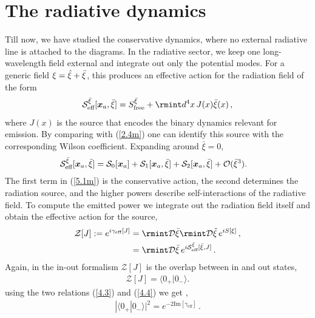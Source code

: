 \section{The radiative dynamics}\label{Sec5}
Till now, we have studied the conservative dynamics, where no external radiative line is attached to the diagrams. In the radiative sector, we keep one long-wavelength field external and integrate out only the potential modes. For a generic field $\xi=\Hat{\xi}+\Bar{\xi}$, this produces an effective action for the radiation field of the form
\begin{equation}
\mathcal{S}_{\text{eff}}^{\Bar{\xi}}[\boldsymbol{x}_a,\Bar{\xi}]=S_{\text{free}}^{\Bar{\xi}}+\rmint d^4 x\,J(x)\Bar{\xi}(x)\,,
\end{equation}
\noindent where $J(x)$ is the source that encodes the binary dynamics relevant for emission. By comparing with (\ref{2.4m}) one can identify this source with the corresponding Wilson coefficient. Expanding around $\bar\xi=0$,
\begin{align}
    \begin{split}
       & \mathcal{S}_{\text{eff}}^{\Bar{\xi}}[\boldsymbol{x}_a,\Bar{\xi}]= \mathcal{S}_{0}[\boldsymbol{x}_a]+\mathcal{S}_{1}[\boldsymbol{x}_a,\Bar{\xi}]+\mathcal{S}_{2}[\boldsymbol{x}_a,\Bar{\xi}]+\mathcal{O}(\bar\xi^3).\label{5.1m}
    \end{split}
\end{align}
The first term in (\ref{5.1m}) is the conservative action, the second determines the radiation source, and the higher powers describe self-interactions of the radiative field. To compute the emitted power we integrate out the radiation field itself and obtain the effective action for the source,
\begin{align}
\begin{split}
   \mathcal{Z}[J]:= e^{i{\gamma}_{\text{eff}}[J]}&=\rmint \mathcal{D}\Bar{\xi}\rmint \mathcal{D}\Hat{\xi}\,e^{iS[{\xi}]}\,,\\ &
   =\rmint \mathcal{D}\Bar{\xi}\, e^{i\mathcal{S}_{\text{eff}}^{\Bar{\xi}}[\Bar{\xi},J]}\,.
   \label{4.3}
   \end{split}
\end{align}
Again, in the in-out formalism $\mathcal{Z}[J]$ is the overlap between in and out states,
\begin{eqnarray}
    \mathcal{Z}[J]=\Big\langle0_+|0_-\Big\rangle.\label{4.4}
\end{eqnarray}
using the two relations (\ref{4.3}) and (\ref{4.4}) we get \cite{nastase_2019},
\begin{eqnarray}
   | \langle0_+|0_-\rangle|^2=e^{-2\text{Im}[\gamma_{\text{eff}}]}\,.
\end{eqnarray}
